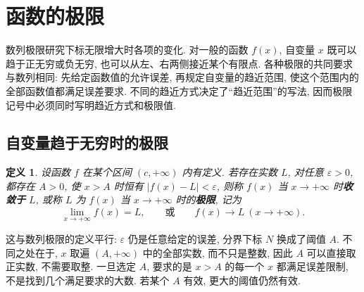 \documentclass[UTF8,openany]{ctexbook}
\theoremstyle{chinesetextbook}
\newtheorem{definition}{定义}[section]
\begin{document}
\section{函数的极限}
数列极限研究下标无限增大时各项的变化. 对一般的函数 $f(x)$, 自变量 $x$ 既可以趋于正无穷或负无穷, 也可以从左、右两侧接近某个有限点. 各种极限的共同要求与数列相同: 先给定函数值的允许误差, 再规定自变量的趋近范围, 使这个范围内的全部函数值都满足误差要求. 不同的趋近方式决定了“趋近范围”的写法, 因而极限记号中必须同时写明趋近方式和极限值.
\subsection{自变量趋于无穷时的极限}
\begin{definition}
设函数 $f$ 在某个区间 $(c,+\infty)$ 内有定义. 若存在实数 $L$, 对任意 $\varepsilon>0$, 都存在 $A>0$, 使 $x>A$ 时恒有 $|f(x)-L|<\varepsilon$, 则称 $f(x)$ 当 $x\to+\infty$ 时\textbf{收敛于} $L$, 或称 $L$ 为 $f(x)$ 当 $x\to+\infty$ 时的\textbf{极限}, 记为
\[
\lim_{x\to+\infty}f(x)=L,\qquad\text{或}\qquad f(x)\to L\ (x\to+\infty).
\]
\end{definition}
这与数列极限的定义平行: $\varepsilon$ 仍是任意给定的误差, 分界下标 $N$ 换成了阈值 $A$. 不同之处在于, $x$ 取遍 $(A,+\infty)$ 中的全部实数, 而不只是整数, 因此 $A$ 可以直接取正实数, 不需要取整. 一旦选定 $A$, 要求的是 $x>A$ 的每一个 $x$ 都满足误差限制, 不是找到几个满足要求的大数. 若某个 $A$ 有效, 更大的阈值仍然有效.
\end{document}
